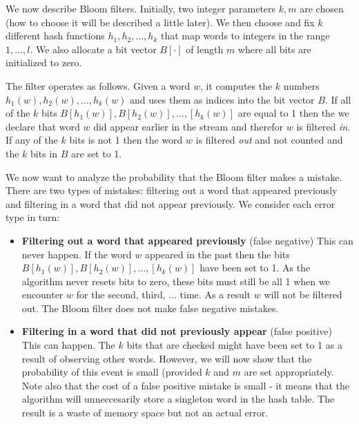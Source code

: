 We now describe Bloom filters. Initially, two integer parameters $k,m$
are chosen (how to choose it will be described a little later). We
then choose and fix $k$ different hash functions $h_1,h_2,\ldots,h_k$
that map words to integers in the range $1,\ldots,l$. We also allocate
a bit vector $B[\cdot]$ of length $m$ where all bits are initialized to
zero.

The filter operates as follows. Given a word $w$, it computes the $k$
numbers $h_1(w),h_2(w),\ldots,h_k(w)$ and uses them as indices into
the bit vector $B$. If all of the $k$ bits
$B[h_1(w)],B[h_2(w)],\ldots,[h_k(w)]$ are equal to 1 then the we
declare that word $w$ did appear earlier in the stream and therefor
$w$ is filtered {\em in}.  If any of the $k$ bits is not 1 then the
word $w$ is filtered {\em out} and not counted and the $k$ bits in $B$
are set to 1.

We now want to analyze the probability that the Bloom filter makes a
mistake. There are two types of mistakes: filtering out a word that
appeared previously and filtering in a word that did not appear
previously. We consider each error type in turn:
\begin{itemize}
\item {\bf Filtering out a word that appeared previously} (false
  negative) This can never happen. If the word $w$ appeared in the
  past then the bits $B[h_1(w)],B[h_2(w)],\ldots,[h_k(w)]$ have been
  set to 1. As the algorithm never resets bits to zero, these bits
  must still be all 1 when we encounter $w$ for the second, third,
  ... time. As a result $w$ will not be filtered out. The Bloom filter
  does not make false negative mistakes.
\item {\bf Filtering in a word that did not previously appear} (false
  positive) This can happen. The $k$ bits that are checked might have
  been set to 1 as a result of observing other words. However, we will
  now show that the probability of this event is small (provided $k$
  and $m$ are set appropriately. Note also that the cost of a false
  positive mistake is small - it means that the algorithm will
  unneccesarily store a singleton word in the hash table. The result
  is a waste of memory space but not an actual error.
\end{itemize}

